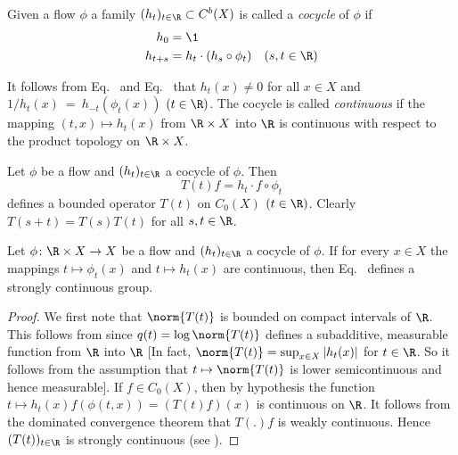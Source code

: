 Given a flow $\phi$ a family $(h_{t})_{t \in \R} \subset C^{b}(X)$ is called a \emph{cocycle} of\/ $\phi$ if
\begin{align}
h_{0} &= \1 \label{eq:b2-3.10} \\
h_{t+s} &= h_{t} \cdot (h_{s} \circ \phi_{t}) \quad (s,t \in \R) \label{eq:b2-3.11}
\end{align}

It follows from Eq.~ and Eq.~ that $h_{t}(x) \neq 0$ for all $x \in X$ and 
$1/h_{t}(x)~=~h_{-t}(\phi_{t}(x))$ $(t \in \R)$.
The cocycle is called \emph{continuous} if the mapping $(t,x) \mapsto h_{t}(x)$ from $\R \times X$ into $\R$ is continuous with respect to the product topology on $\R \times X$.

Let $\phi$ be a flow and $(h_{t})_{t \in \R}$ a cocycle of\/ $\phi$.
Then
\begin{equation}\label{eq:b2-3.12}
T(t)f = h_{t} \cdot f \circ \phi_{t}
\end{equation}
defines a bounded operator $T(t)$ on $C_{0}(X)$ $(t \in \R)$.
Clearly $T(s+t) = T(s)T(t)$ for all $s,t \in \R$.

\begin{proposition}\label{prop:b2-3.8}
Let $\phi \colon \R \times X \to X$ be a flow and $(h_{t})_{t \in \R}$ a cocycle of\/ $\phi$.
If for every $x \in X$ the mappings $t \mapsto \phi_{t}(x)$ and $t \mapsto h_{t}(x)$ are continuous, then Eq.~ defines a strongly continuous group.
\end{proposition}
\begin{proof}
We first note that $\norm{T(t)}$ is bounded on compact intervals of\/ $\R$.
This follows from \textcite[7.4.1]{hillephillips:1957} since $q(t) = \log\norm{T(t)}$ defines a subadditive, measurable function from $\R$ into $\R$ [In fact, $\norm{T(t)} = \sup_{x \in X}|h_{t}(x)|$ for $t \in \R$.
So it follows from the assumption that $t \mapsto \norm{T(t)}$ is lower semicontinuous and hence measurable].
If\/ $f \in C_{0}(X)$, then by hypothesis the function
$t \mapsto h_{t}(x) f(\phi(t,x)) = (T(t) f) (x)$ is continuous on $\R$.
It follows from the dominated convergence theorem that $T(.)f$ is weakly continuous.
Hence $(T(t))_{t \in \R}$ is strongly continuous (see \eg \textcite[Proposition  1.23]{davies:1980}).
\end{proof}


